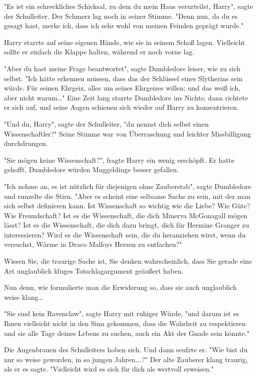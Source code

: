 {"Es ist ein schreckliches Schicksal, zu dem du mein Haus verurteilst, Harry", sagte der Schulleiter. Der Schmerz lag noch in seiner Stimme. "Denn nun, da du es gesagt hast, merke ich, dass ich sehr wohl von meinen Feinden geprägt wurde."

Harry starrte auf seine eigenen Hände, wie sie in seinem Schoß lagen. Vielleicht sollte er einfach die Klappe halten, während er noch vorne lag.

"Aber du hast meine Frage beantwortet", sagte Dumbledore leiser, wie zu sich selbst. "Ich hätte erkennen müssen, dass das der Schlüssel eines Slytherins sein würde. Für seinen Ehrgeiz, alles um seines Ehrgeizes willen; und das weiß ich, aber nicht warum…" Eine Zeit lang starrte Dumbledore ins Nichts; dann richtete er sich auf, und seine Augen schienen sich wieder auf Harry zu konzentrieren.

"Und du, Harry", sagte der Schulleiter, "du nennst dich selbst einen Wissenschaftler?" Seine Stimme war von Überraschung und leichter Missbilligung durchdrungen.

"Sie mögen keine Wissenschaft?", fragte Harry ein wenig erschöpft. Er hatte gehofft, Dumbledore würden Muggeldinge besser gefallen.

"Ich nehme an, es ist nützlich für diejenigen ohne Zauberstab", sagte Dumbledore und runzelte die Stirn. "Aber es scheint eine seltsame Sache zu sein, mit der man sich selbst definieren kann. Ist Wissenschaft so wichtig wie die Liebe? Wie Güte? Wie Freundschaft? Ist es die Wissenschaft, die dich Minerva McGonagall mögen lässt? Ist es die Wissenschaft, die dich dazu bringt, dich für Hermine Granger zu interessieren? Wird es die Wissenschaft sein, die du heranziehen wirst, wenn du versuchst, Wärme in Draco Malfoys Herzen zu entfachen?"

Wissen Sie, die traurige Sache ist, Sie denken wahrscheinlich, dass Sie gerade eine Art unglaublich kluges Totschlagargument geäußert haben.

Nun denn, wie formulierte man die Erwiderung so, dass sie auch unglaublich weise klang…

"Sie sind kein Ravenclaw", sagte Harry mit ruhiger Würde, "und darum ist es Ihnen vielleicht nicht in den Sinn gekommen, dass die Wahrheit zu respektieren und sie alle Tage deines Lebens zu suchen, auch ein Akt der Gnade sein könnte."

Die Augenbrauen des Schulleiters hoben sich. Und dann seufzte er. "Wie bist du nur so weise geworden, in so jungen Jahren….?" Der alte Zauberer klang traurig, als er es sagte. "Vielleicht wird es sich für dich als wertvoll erweisen."

}
